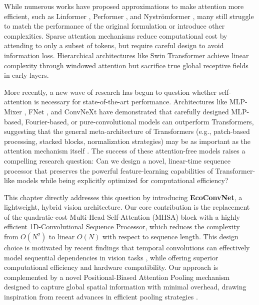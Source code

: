 \documentclass[12pt, a4paper]{article}
\begin{document}
While numerous works have proposed approximations to make attention more efficient, such as Linformer \cite{wang2020linformer}, Performer \cite{choromanski2020rethinking}, and Nyströmformer \cite{xiong2021nystromformer}, many still struggle to match the performance of the original formulation or introduce other complexities. Sparse attention mechanisms \cite{child2019generating, zaheer2020big} reduce computational cost by attending to only a subset of tokens, but require careful design to avoid information loss. Hierarchical architectures like Swin Transformer \cite{liu2021swin} achieve linear complexity through windowed attention but sacrifice true global receptive fields in early layers.

More recently, a new wave of research has begun to question whether self-attention is necessary for state-of-the-art performance. Architectures like MLP-Mixer \cite{tolstikhin2021mlp}, FNet \cite{leethorp2021fnet}, and ConvNeXt \cite{liu2022convnet} have demonstrated that carefully designed MLP-based, Fourier-based, or pure-convolutional models can outperform Transformers, suggesting that the general meta-architecture of Transformers (e.g., patch-based processing, stacked blocks, normalization strategies) may be as important as the attention mechanism itself \cite{yu2022metaformer}. The success of these attention-free models raises a compelling research question: Can we design a novel, linear-time sequence processor that preserves the powerful feature-learning capabilities of Transformer-like models while being explicitly optimized for computational efficiency?

This chapter directly addresses this question by introducing \textbf{EcoConvNet}, a lightweight, hybrid vision architecture. Our core contribution is the replacement of the quadratic-cost Multi-Head Self-Attention (MHSA) block with a highly efficient 1D-Convolutional Sequence Processor, which reduces the complexity from $O(N^2)$ to linear $O(N)$ with respect to sequence length. This design choice is motivated by recent findings that temporal convolutions can effectively model sequential dependencies in vision tasks \cite{bai2018empirical, vaswani2021scaling}, while offering superior computational efficiency and hardware compatibility. Our approach is complemented by a novel Positional-Biased Attention Pooling mechanism designed to capture global spatial information with minimal overhead, drawing inspiration from recent advances in efficient pooling strategies \cite{jaegle2021perceiver}.
\end{document}
